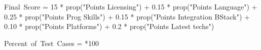

Final\ Score = 15 * prop("Points Licensing") + 0.15 * prop("Points Language") + 
0.25 * prop("Points Prog Skills") + 0.15 * prop("Points Integration BStack") + 
0.10 * prop("Points Platforms") + 0.2 * prop("Points Latest techs")


 Percent\ of\ Test\ Cases = *100\\